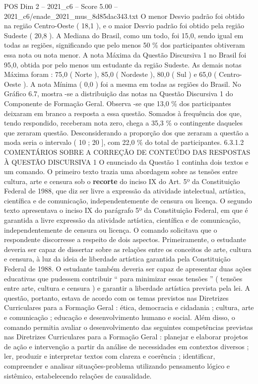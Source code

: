 \begin{textsample}{POS Dim 2 – 2021\_c6 – Score 5.00 – 2021\_c6/enade\_2021\_mus\_8d85dac343.txt}
O menor Desvio padrão foi obtido na região Centro-Oeste ( 18,1 ), e o maior Desvio padrão foi obtido pela região Sudeste ( 20,8 ).
A Mediana do Brasil, como um todo, foi 15,0, sendo igual em todas as regiões, significando que pelo menos 50 \% dos participantes obtiveram essa nota ou nota menor.
A nota Máxima da Questão Discursiva 1 no Brasil foi 95,0, obtida por pelo menos um estudante da região Sudeste.
As demais notas Máxima foram : 75,0 ( Norte ), 85,0 ( Nordeste ), 80,0 ( Sul ) e 65,0 ( Centro-Oeste ).
A nota Mínima ( 0,0 ) foi a mesma em todas as regiões do Brasil.
No Gráfico 6.7, mostra -se a distribuição das notas na Questão Discursiva 1 do Componente de Formação Geral.
Observa -se que 13,0 \% dos participantes deixaram em branco a resposta a essa questão.
Somados à frequência dos que, tendo respondido, receberam nota zero, chega a 35,3 \% o contingente daqueles que zeraram questão.
Desconsiderando a proporção dos que zeraram a questão a moda seria o intervalo ( 10 ; 20 ], com 22,0 \% do total de participantes. 6.3.1.2 COMENTÁRIOS SOBRE A CORREÇÃO DE CONTEÚDO DAS RESPOSTAS À QUESTÃO DISCURSIVA 1 O enunciado da Questão 1 continha dois textos e um comando.
O primeiro texto trazia uma abordagem sobre as tensões entre cultura, arte e censura sob o \textbf{recorte} do inciso IX do Art. 5º da Constituição Federal de 1988, que diz ser livre a expressão da atividade intelectual, artística, científica e de comunicação, independentemente de censura ou licença.
O segundo texto apresentava o inciso IX do parágrafo 5º da Constituição Federal, em que é garantida a livre expressão da atividade artística, científica e de comunicação, independentemente de censura ou licença.
O comando solicitava que o respondente discorresse a respeito de dois aspectos.
Primeiramente, o estudante deveria ser capaz de dissertar sobre as relações entre os conceitos de arte, cultura e censura, à luz da ideia de liberdade artística garantida pela Constituição Federal de 1988.
O estudante também deveria ser capaz de apresentar duas ações educativas que pudessem contribuir “ para minimizar essas tensões ” ( tensões entre arte, cultura e censura ) e garantir a liberdade artística prevista pela lei.
A questão, portanto, estava de acordo com os temas previstos nas Diretrizes Curriculares para a Formação Geral : ética, democracia e cidadania ; cultura, arte e comunicação ; educação e desenvolvimento humano e social.
Além disso, o comando permitia avaliar o desenvolvimento das seguintes competências previstas nas Diretrizes Curriculares para a Formação Geral : planejar e elaborar projetos de ação e intervenção a partir da análise de necessidades em contextos diversos ; ler, produzir e interpretar textos com clareza e coerência ; identificar, compreender e analisar situações-problema utilizando pensamento lógico e sistêmico, estabelecendo relações de causalidade.

\end{textsample}
